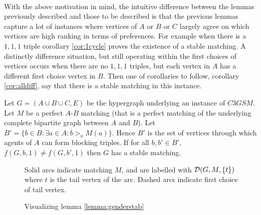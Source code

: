 \paragraph{}
With the above motivation in mind, the intuitive difference between the lemmas previously described and those to be described is that the previous lemmas capture a lot of instances where vertices of $A$ or $B$ or $C$ largely agree on which vertices are high ranking in terms of preferences. For example when there is a $1,1,1$ triple corollary \ref{cor:1cycle} proves the existence of a stable matching. A distinctly difference situation, but still operating within the first choices of vertices occurs when there are no $1,1,1$ triples, but each vertex in $A$ has a different first choice vertex in $B$. Then one of corollaries to follow, corollary \ref{cor:alldiff}, say that there is a stable matching in this instance.
\begin{lemma}\label{lemma:genderstab}
Let $G=(A\cup B\cup C, E)$ be the hypergraph underlying an instance of $C3GSM$. Let $M$ be a perfect $A$-$B$ matching (that is a perfect matching of the underlying complete bipartite graph between $A$ and $B$). Let $B' = \{ b \in B : \exists a \in A : b >_a M(a) \}$. Hence $B'$ is the set of vertices through which agents of $A$ can form blocking triples. If for all $b, b' \in B'$, $f(G,b,1) \neq f(G,b',1)$ then $G$ has a stable matching.
\end{lemma}
\begin{figure}[h]
\centering
{}
\caption{Visualizing lemma \ref{lemma:genderstab}}
\small
\begin{flushleft}
Solid arcs indicate matching $M$, and are labelled with $\mathcal{D}(G,M,\{t\})$ where $t$ is the tail vertex of the arc. Dashed arcs indicate first choice of tail vertex.
\end{flushleft}
\end{figure}
